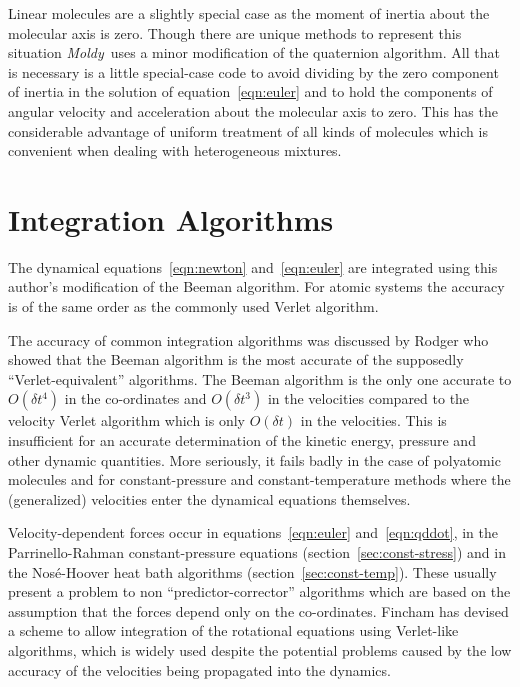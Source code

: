 \documentclass[a4paper,twoside]{report}
\newcommand{\moldy}{\emph{Moldy}}
\begin{document}
Linear molecules are a slightly special case as the moment of inertia
about the molecular axis is zero.  Though there are unique methods to
represent this situation\cite[page 90]{allen:87} \moldy\ uses a minor
modification of the quaternion algorithm.  All that is necessary is a
little special-case code to avoid dividing by the zero component of
inertia in the solution of equation~\ref{eqn:euler} and to hold the
components of angular velocity and acceleration about the molecular
axis to zero.  This has the considerable advantage of uniform
treatment of all kinds of molecules which is convenient when dealing
with heterogeneous mixtures.

\section{Integration Algorithms}   %
\label{sec:beeman}

The dynamical equations~\ref{eqn:newton} and~\ref{eqn:euler} are
integrated using this author's modification\cite{refson:85} of the
Beeman algorithm\hspace{0pt}\cite{beeman:76}.  For atomic systems the
accuracy is of the same order as the commonly used Verlet
algorithm\cite{verlet:67}.

The accuracy of common integration algorithms was discussed by
Rodger\cite{rodger:89} who showed that the Beeman algorithm is the
most accurate of the supposedly ``Verlet-equivalent'' algorithms. The
Beeman algorithm is the only one accurate to $O(\delta t^4)$ in the
co-ordinates and $O(\delta t^3)$ in the velocities compared to the
velocity Verlet algorithm which is only $O(\delta t)$ in the
velocities. This is insufficient for an accurate determination of the
kinetic energy, pressure and other dynamic quantities. More seriously,
it fails badly in the case of polyatomic molecules and for
constant-pressure and constant-temperature methods where the
(generalized) velocities enter the dynamical equations themselves.

Velocity-dependent forces occur in equations~\ref{eqn:euler}
and~\ref{eqn:qddot}, in the Parrinello-Rahman constant-pressure
equations (section~\ref{sec:const-stress}) and in the Nos\'e-Hoover
heat bath algorithms (section~\ref{sec:const-temp}). These usually
present a problem to non ``predictor-corrector'' algorithms which are
based on the assumption that the forces depend only on the
co-ordinates.  Fincham has devised a scheme to allow integration of
the rotational equations using Verlet-like
algorithms\cite{fincham:81}, which is widely used despite the
potential problems caused by the low accuracy of the velocities being
propagated into the dynamics.
\end{document}
